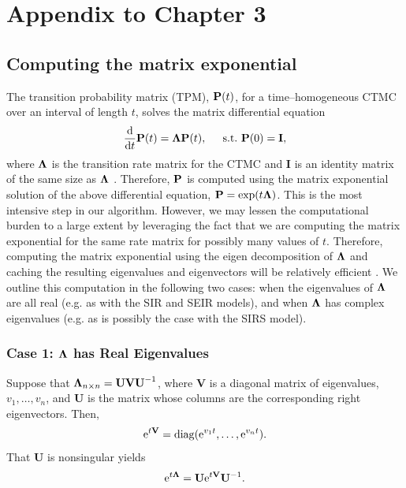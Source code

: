 \chapter{Appendix to Chapter 3}
\label{chap:appendix_ch3}

\section{Computing the matrix exponential}
\label{sec:mtx_exp}
The transition probability matrix (TPM), $ \mathbf{P}(t) $, for a time--homogeneous CTMC over an interval of length $ t $, solves the matrix differential equation \[ \frac{\mathrm{d}}{\mathrm{d} t}\mathbf{P}(t) = \boldsymbol{\Lambda}\mathbf{P}(t),\hspace{0.2in} \mathrm{s.t.\ }\mathbf{P}(0) = \mathbf{I}, \] where $ \boldsymbol{\Lambda} $ is the transition rate matrix for the CTMC and $ \mathbf{I} $ is an identity matrix of the same size as $ \boldsymbol{\Lambda} $ \citep{wilkinson2011stochastic}.  Therefore, $ \mathbf{P} $ is computed using the matrix exponential solution of the above differential equation, $ \mathbf{P} = \exp(t\boldsymbol{\Lambda}) $. This is the most intensive step in our algorithm. However, we may lessen the computational burden to a large extent by leveraging the fact that we are computing the matrix exponential for the same rate matrix for possibly many values of $ t $. Therefore, computing the matrix exponential using the eigen decomposition of $ \boldsymbol{\Lambda} $ and caching the resulting eigenvalues and eigenvectors will be relatively efficient \citep{moler2003nineteen}. We outline this computation in the following two cases: when the eigenvalues of $ \boldsymbol{\Lambda} $ are all real (e.g. as with the SIR and SEIR models), and when $ \boldsymbol{\Lambda} $ has complex eigenvalues (e.g. as is possibly the case with the SIRS model).

\subsection{Case 1: $ \boldsymbol{\Lambda} $ has Real Eigenvalues}
Suppose that $ \boldsymbol{\Lambda}_{n\times n} =  \mathbf{UVU}^{-1}$, where $ \mathbf{V} $ is a diagonal matrix of eigenvalues, $ v_1,\dots,v_n $, and $ \mathbf{U} $ is the matrix whose columns are the corresponding right eigenvectors. Then, \[ \mathrm{e}^{t\mathbf{V}} = \mathrm{diag}(\mathrm{e}^{v_1t},\dots,\mathrm{e}^{v_nt}). \] That $ \mathbf{U} $ is nonsingular yields \[ \mathrm{e}^{t\boldsymbol{\Lambda}} = \mathbf{U} \mathrm{e}^{t\mathbf{V}}\mathbf{U}^{-1}. \] 

